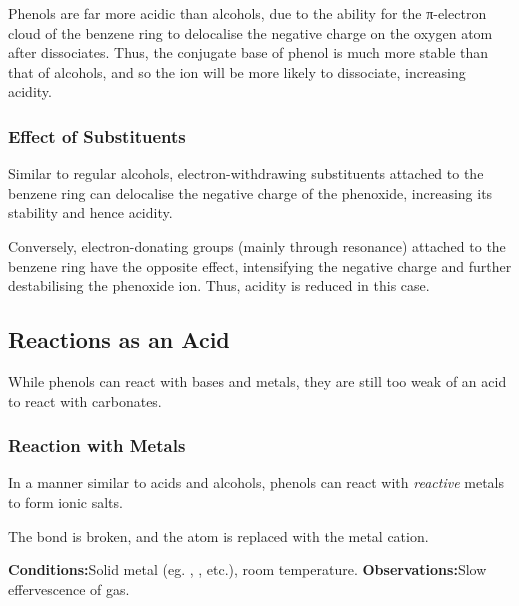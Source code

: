 			Phenols are far more acidic than alcohols, due to the ability for the π-electron cloud of the benzene ring to delocalise the
			negative charge on the oxygen atom after  dissociates. Thus, the conjugate base of phenol is much more stable than
			that of alcohols, and so the  ion will be more likely to dissociate, increasing acidity.

			\subsubsection{Effect of Substituents}

				Similar to regular alcohols, electron-withdrawing substituents attached to the benzene ring can delocalise the negative
				charge of the phenoxide, increasing its stability and hence acidity.

				Conversely, electron-donating groups (mainly through resonance) attached to the benzene ring have the opposite effect,
				intensifying the negative charge and further destabilising the phenoxide ion. Thus, acidity is reduced in this case.




		\pagebreak
		\subsection{Reactions as an Acid}

			While phenols can react with bases and metals, they are still too weak of an acid to react with carbonates.

			\subsubsection{Reaction with Metals}
				In a manner similar to acids and alcohols, phenols can react with \textit{reactive} metals to form ionic salts.

				The  bond is broken, and the  atom is replaced with the metal cation.

				\vspace{1.5em}
				\vbox{\textbf{Conditions:}\tabto{35mm}Solid metal (eg. , , etc.), room temperature.}
				\vbox{\textbf{Observations:}\tabto{35mm}Slow effervescence of  gas.}



